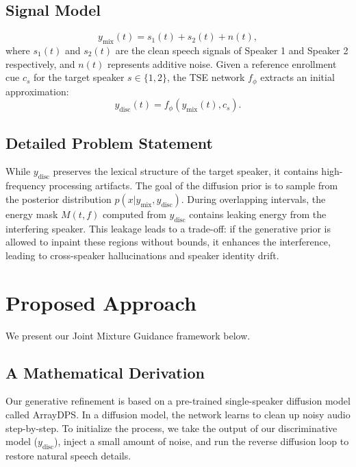 \documentclass[conference]{IEEEtran}
\begin{document}
\subsection{Signal Model}
\begin{equation}
y_{\text{mix}}(t) = s_1(t) + s_2(t) + n(t), \label{eq:mixture}
\end{equation}
where $s_1(t)$ and $s_2(t)$ are the clean speech signals of Speaker 1 and Speaker 2 respectively, and $n(t)$ represents additive noise. Given a reference enrollment cue $c_s$ for the target speaker $s \in \{1, 2\}$, the TSE network $f_{\phi}$ extracts an initial approximation:
\begin{equation}
y_{\text{disc}}(t) = f_{\phi}(y_{\text{mix}}(t), c_s). \label{eq:disc}
\end{equation}

\subsection{Detailed Problem Statement}
While $y_{\text{disc}}$ preserves the lexical structure of the target speaker, it contains high-frequency processing artifacts. The goal of the diffusion prior is to sample from the posterior distribution $p(x | y_{\text{mix}}, y_{\text{disc}})$. During overlapping intervals, the energy mask $M(t, f)$ computed from $y_{\text{disc}}$ contains leaking energy from the interfering speaker. This leakage leads to a trade-off: if the generative prior is allowed to inpaint these regions without bounds, it enhances the interference, leading to cross-speaker hallucinations and speaker identity drift.

\section{Proposed Approach}
We present our Joint Mixture Guidance framework below.

\subsection{A Mathematical Derivation}
Our generative refinement is based on a pre-trained single-speaker diffusion model called ArrayDPS\cite{b1}. In a diffusion model, the network learns to clean up noisy audio step-by-step. To initialize the process, we take the output of our discriminative model ($y_{\text{disc}}$), inject a small amount of noise, and run the reverse diffusion loop to restore natural speech details.
\end{document}
